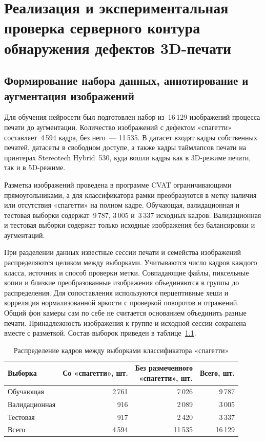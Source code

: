 \chapter{Реализация и экспериментальная проверка серверного контура обнаружения дефектов 3D-печати}

\section{Формирование набора данных, аннотирование и аугментация изображений}

Для обучения нейросети был подготовлен набор из~16\,129 изображений процесса печати до аугментации. Количество изображений с дефектом «спагетти» составляет~4\,594 кадра, без него~--- 11\,535. В датасет входят кадры собственных печатей, датасеты в свободном доступе, а также   кадры таймлапсов печати на принтерах Stereotech Hybrid~530, куда вошли кадры как в 3D-режиме печати, так и в 5D-режиме. 

Разметка изображений проведена в программе CVAT ограничивающими прямоугольниками, а для классификатора рамки преобразуются в метку наличия или отсутствия «спагетти» на полном кадре. Обучающая, валидационная и тестовая выборки содержат~9\,787, 3\,005 и~3\,337 исходных кадров. Валидационная и тестовая выборки содержат только исходные изображения без балансировки и аугментаций.

При разделении данных известные сессии печати и семейства изображений распределяются целиком между выборками. Учитываются число кадров каждого класса, источник и способ проверки метки. Совпадающие файлы, пиксельные копии и близкие преобразованные изображения объединяются в группы до распределения. Для сопоставления используются перцептивные хеши и корреляция нормализованной яркости с проверкой поворотов и отражений. Общий фон камеры сам по себе не считается основанием объединить разные печати. Принадлежность изображения к группе и исходной сессии сохранена вместе с разметкой. Состав выборок приведен в таблице~\ref{tab:spaghetti-v5-splits}.

\begin{table}[h!]
  \caption{Распределение кадров между выборками классификатора «спагетти»}
  \label{tab:spaghetti-v5-splits}
  \centering
  \begin{tabular}{|l|r|r|r|}
    \hline
    Выборка & Со «спагетти», шт. & \makecell{Без размеченного\\«спагетти», шт.} & Всего, шт. \\ \hline
    Обучающая & 2\,761 & 7\,026 & 9\,787 \\ \hline
    Валидационная & 916 & 2\,089 & 3\,005 \\ \hline
    Тестовая & 917 & 2\,420 & 3\,337 \\ \hline
    Всего & 4\,594 & 11\,535 & 16\,129 \\ \hline
  \end{tabular}
\end{table}

